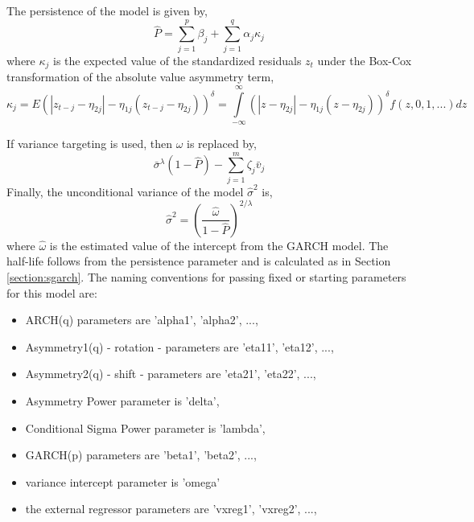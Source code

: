 The persistence of the model is given by,
\begin{equation}\label{eq:fgarchp}
\hat P = \sum\limits_{j = 1}^p {{\beta_j} + } \sum\limits_{j = 1}^q {{\alpha_j}} {\kappa_j}
\end{equation}
where $\kappa_j$ is the expected value of the standardized residuals $z_t$ under
the Box-Cox transformation of the absolute value asymmetry term,
\begin{equation}\label{eq:fgarchkappa}
{\kappa _j} = E{\left( {\left| {{z_{t - j}} - {\eta _{2j}}} \right| - {\eta _{1j}}\left( {{z_{t - j}} - {\eta _{2j}}} \right)} \right)^\delta } = \int\limits_{ - \infty }^\infty  {{{\left( {\left| {z - {\eta _{2j}}} \right| - {\eta _{1j}}\left( {z - {\eta _{2j}}} \right)} \right)}^\delta }f\left( {z,0,1,...} \right)dz}
\end{equation}

If variance targeting is used, then $\omega$ is replaced by,
\begin{equation}\label{eq:fgarchvt}
{{\bar \sigma }^\lambda }\left( {1 - \hat P} \right) - \sum\limits_{j = 1}^m {{\zeta _j}{{\bar v}_j}}
\end{equation}
Finally, the unconditional variance of the model ${\hat \sigma }^2$ is,
\begin{equation}\label{eq:fgarchuncv}
{{\hat \sigma }^2} = {\left( {\frac{{\hat \omega }}{{1 - \hat P}}} \right)^{2/\lambda }}
\end{equation}
where $\hat \omega$ is the estimated value of the intercept from the GARCH model.
The half-life follows from the persistence parameter and is calculated as in
Section \ref{section:sgarch}.
The naming conventions for passing fixed or starting parameters for this model
are:
\begin{itemize}
\item ARCH(q) parameters are 'alpha1', 'alpha2', ...,
\item Asymmetry1(q) - rotation - parameters are 'eta11', 'eta12', ...,
\item Asymmetry2(q) - shift - parameters are 'eta21', 'eta22', ...,
\item Asymmetry Power parameter is 'delta',
\item Conditional Sigma Power parameter is 'lambda',
\item GARCH(p) parameters are 'beta1', 'beta2', ...,
\item variance intercept parameter is 'omega'
\item the external regressor parameters are 'vxreg1', 'vxreg2', ...,
\end{itemize}


